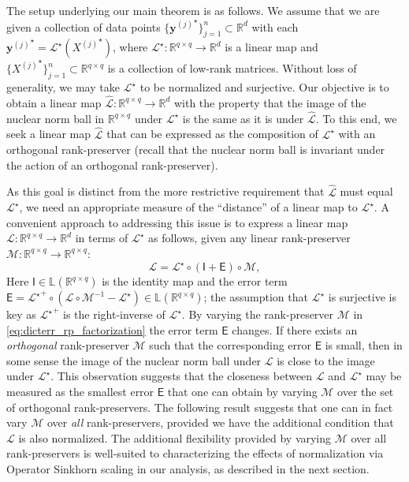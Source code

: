 \documentclass[11pt,letterpaper]{article}
\newcommand{\R}{\mathbb{R}}
\newcommand{\by}{\mathbf{y}}
\renewcommand{\L}{\mathcal{L}}
\newcommand{\sfe}{\mathsf{E}}
\newcommand{\sfi}{\mathsf{I}}
\begin{document}
The setup underlying our main theorem is as follows.  We assume that we are given a collection of data points $\{{\by^{(j)}}^\star\}_{j=1}^n \subset \R^d$ with each ${\by^{(j)}}^\star = \L^\star\left({X^{(j)}}^\star\right)$, where $\L^\star : \R^{q \times q} \rightarrow \R^d$ is a linear map and $\{{X^{(j)}}^\star\}_{j=1}^n \subset \R^{q \times q}$ is a collection of low-rank matrices.  Without loss of generality, we may take $\L^\star$ to be normalized and surjective.  Our objective is to obtain a linear map $\hat{\L} : \R^{q \times q} \rightarrow \R^d$ with the property that the image of the nuclear norm ball in $\R^{q \times q}$ under $\L^\star$ is the same as it is under $\hat{\L}$.  To this end, we seek a linear map $\hat{\L}$ that can be expressed as the composition of $\L^\star$ with an orthogonal rank-preserver (recall that the nuclear norm ball is invariant under the action of an orthogonal rank-preserver).

As this goal is distinct from the more restrictive requirement that $\hat{\L}$ must equal $\L^\star$, we need an appropriate measure of the ``distance'' of a linear map to $\L^\star$.  A convenient approach to addressing this issue is to express a linear map $\L : \R^{q \times q} \rightarrow \R^d$ in terms of $\L^\star$ as follows, given any linear rank-preserver $\mathcal{M} : \R^{q \times q} \rightarrow \R^{q \times q}$:
\begin{equation} \label{eq:dicterr_rp_factorization}
\L = \L^\star \circ (\sfi + \sfe) \circ \mathcal{M},
\end{equation}
Here $\sfi \in \mathbb{L}(\R^{q \times q})$ is the identity map and the error term $\sfe = {\L^{\star}}^+ \circ (\L \circ \mathcal{M}^{-1} - \L^\star) \in \mathbb{L}(\R^{q \times q})$; the assumption that $\L^\star$ is surjective is key as ${\L^{\star}}^+$ is the right-inverse of $\L^\star$.  By varying the rank-preserver $\mathcal{M}$ in \eqref{eq:dicterr_rp_factorization} the error term $\sfe$ changes. If there exists an \emph{orthogonal} rank-preserver $\mathcal{M}$ such that the corresponding error $\sfe$ is small, then in some sense the image of the nuclear norm ball under $\L$ is close to the image under $\L^\star$.  This observation suggests that the closeness between $\L$ and $\L^\star$ may be measured as the smallest error $\sfe$ that one can obtain by varying $\mathcal{M}$ over the set of orthogonal rank-preservers.  The following result suggests that one can in fact vary $\mathcal{M}$ over \emph{all} rank-preservers, provided we have the additional condition that $\L$ is also normalized.  The additional flexibility provided by varying $\mathcal{M}$ over all rank-preservers is well-suited to characterizing the effects of normalization via Operator Sinkhorn scaling in our analysis, as described in the next section.
\end{document}
